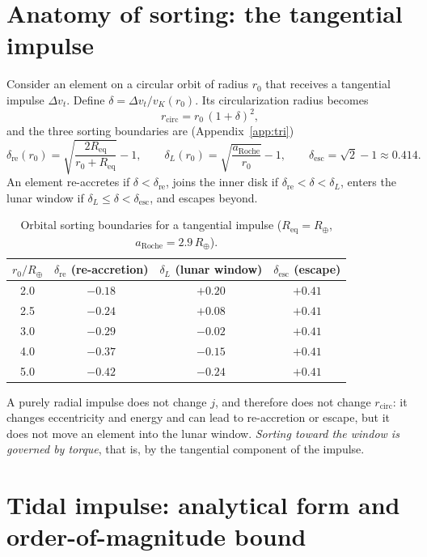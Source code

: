\documentclass[11pt,a4paper,openany]{report}
\newcommand{\Rt}{R_{\oplus}}
\newcommand{\Req}{R_{\mathrm{eq}}}
\newcommand{\aR}{a_{\mathrm{Roche}}}
\begin{document}
\section{Anatomy of sorting: the tangential impulse}

Consider an element on a circular orbit of radius $r_0$ that receives a tangential impulse
$\Delta v_t$. Define $\delta=\Delta v_t/v_K(r_0)$. Its circularization radius becomes
\begin{equation}
r_{\mathrm{circ}}=r_0\,(1+\delta)^2,
\label{eq:rcirc-delta}
\end{equation}
and the three sorting boundaries are (Appendix~\ref{app:tri})
\begin{equation}
\delta_{\mathrm{re}}(r_0)=\sqrt{\frac{2\Req}{r_0+\Req}}-1,\qquad
\delta_L(r_0)=\sqrt{\frac{\aR}{r_0}}-1,\qquad
\delta_{\mathrm{esc}}=\sqrt2-1\approx0.414.
\label{eq:frontieres}
\end{equation}
An element re-accretes if $\delta<\delta_{\mathrm{re}}$, joins the inner disk if
$\delta_{\mathrm{re}}<\delta<\delta_L$, enters the lunar window if
$\delta_L\le\delta<\delta_{\mathrm{esc}}$, and escapes beyond.

\begin{table}[htbp]
\centering
\small
\caption{Orbital sorting boundaries for a tangential impulse ($\Req=\Rt$, $\aR=2.9\,\Rt$).}
\label{tab:frontieres}
\begin{tabular}{cccc}
\toprule
$r_0/\Rt$ & $\delta_{\mathrm{re}}$ (re-accretion) & $\delta_L$ (lunar window) & $\delta_{\mathrm{esc}}$ (escape) \\
\midrule
2.0 & $-0.18$ & $+0.20$ & $+0.41$ \\
2.5 & $-0.24$ & $+0.08$ & $+0.41$ \\
3.0 & $-0.29$ & $-0.02$ & $+0.41$ \\
4.0 & $-0.37$ & $-0.15$ & $+0.41$ \\
5.0 & $-0.42$ & $-0.24$ & $+0.41$ \\
\bottomrule
\end{tabular}
\end{table}

A purely radial impulse does not change $j$, and therefore does not change $r_{\mathrm{circ}}$: it
changes eccentricity and energy and can lead to re-accretion or escape, but it does not move an
element into the lunar window. \emph{Sorting toward the window is governed by torque}, that is, by
the tangential component of the impulse.

\section{Tidal impulse: analytical form and order-of-magnitude bound}
\end{document}
